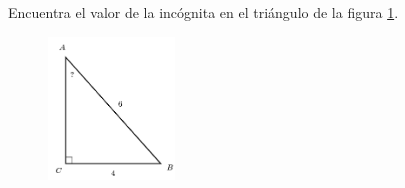 \question[15]  Encuentra el valor de la incógnita en el triángulo de la figura \ref{fig:angle_functrig_03}.
\begin{figure}[H]
    \begin{center}
        \includegraphics[width=0.3\textwidth]{../images/angle_functrig_03.png}
    \end{center}
    \caption{}
    \label{fig:angle_functrig_03}
\end{figure}